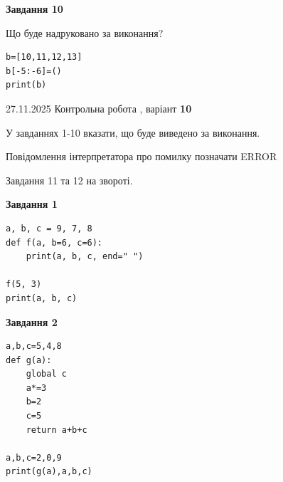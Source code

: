 \documentclass[12pt, ukrainian]{article}
\begin{document}
{{{{{{{{{{\begin{minipage}[t]{10.5cm}
\begin{center}
\textbf{Завдання 10}
\end{center}
Що буде надруковано за виконання?\par
\begin{verbatim}
b=[10,11,12,13]
b[-5:-6]=()
print(b)
\end{verbatim}

\end{minipage}

}
\newpage

{{ 27.11.2025 Контрольна робота , варіант  \No \textbf { 10 }\par}}
{

{%



У завданнях 1-10 вказати, що буде виведено за виконання.

Повідомлення інтерпретатора про помилку позначати ERROR

Завдання 11 та 12 на звороті.

\begin{minipage}[t]{7.5cm}

\begin{center}
\textbf{Завдання 1}
\end{center}

\begin{verbatim}
a, b, c = 9, 7, 8
def f(a, b=6, c=6):
    print(a, b, c, end=" ")

f(5, 3)
print(a, b, c)
\end{verbatim}



\begin{center}
\textbf{Завдання 2}
\end{center}

\begin{verbatim}
a,b,c=5,4,8
def g(a):
    global c
    a*=3
    b=2
    c=5
    return a+b+c

a,b,c=2,0,9
print(g(a),a,b,c)
\end{verbatim}




\end{minipage}}}}}}}}}}}}
\end{document}
